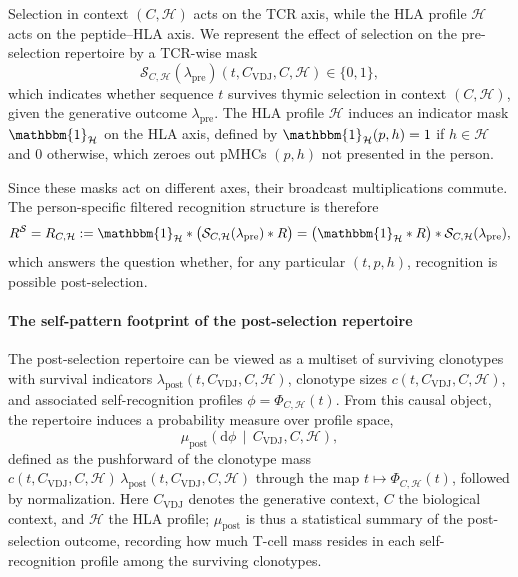 \documentclass[11pt]{article}
\begin{document}
Selection in context $(C,\mathcal{H})$ acts on the TCR axis, while the HLA profile
$\mathcal{H}$ acts on the peptide--HLA axis. We represent the effect of selection on
the pre-selection repertoire by a TCR-wise mask
\[
  \mathcal{S}_{C,\mathcal{H}}(\lambda_{\mathrm{pre}})(t, C_{\mathrm{VDJ}},C,\mathcal{H})
  \in \{0,1\},
\]
which indicates whether sequence $t$ survives thymic selection in context
$(C,\mathcal{H})$, given the generative outcome $\lambda_{\mathrm{pre}}$. The HLA
profile $\mathcal{H}$ induces an indicator mask $\mathbbm{1}_{\mathcal{H}}$ on the
HLA axis, defined by $\mathbbm{1}_{\mathcal{H}}(p,h) = 1$ if $h \in \mathcal{H}$ and
$0$ otherwise, which zeroes out pMHCs $(p,h)$ not presented in the person.

Since these masks act on different axes, their broadcast multiplications
commute. The person-specific filtered recognition structure is therefore
\[
  R^{\mathcal{S}} = R_{C,\mathcal{H}}
  :=
  \mathbbm{1}_{\mathcal{H}} * \big(\mathcal{S}_{C,\mathcal{H}}(\lambda_{\mathrm{pre}}) * R\big)
  =
  \big(\mathbbm{1}_{\mathcal{H}} * R\big) * \mathcal{S}_{C,\mathcal{H}}(\lambda_{\mathrm{pre}}),
\]
which answers the question whether, for any particular $(t,p,h)$, recognition is possible post-selection.



\paragraph{The self-pattern footprint of the post-selection repertoire}

The post-selection repertoire can be viewed as a multiset of surviving clonotypes with survival indicators \(\lambda_{\mathrm{post}}(t, C_{\mathrm{VDJ}},C,\mathcal{H})\), clonotype sizes \(c(t, C_{\mathrm{VDJ}},C,\mathcal{H})\), and associated self-recognition profiles \(\phi = \Phi_{C,\mathcal{H}}(t)\). From this causal object, the repertoire induces a probability measure over profile space,
\[
    \mu_{\mathrm{post}}\!\left(\mathrm{d}\phi \,\middle|\, C_{\mathrm{VDJ}}, C, \mathcal{H}\right),
\]
defined as the pushforward of the clonotype mass
\(c(t, C_{\mathrm{VDJ}},C,\mathcal{H})\,\lambda_{\mathrm{post}}(t, C_{\mathrm{VDJ}},C,\mathcal{H})\)
through the map \(t \mapsto \Phi_{C,\mathcal{H}}(t)\), followed by normalization. Here \(C_{\mathrm{VDJ}}\) denotes the generative context, \(C\) the biological context, and \(\mathcal{H}\) the HLA profile; \(\mu_{\mathrm{post}}\) is thus a statistical summary of the post-selection outcome, recording how much T-cell mass resides in each self-recognition profile among the surviving clonotypes.
\end{document}
